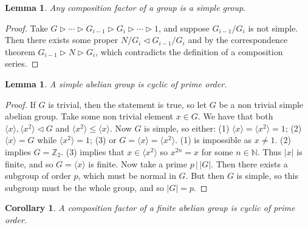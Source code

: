 \documentclass[a4paper,10pt]{article}
\newcommand{\NN}{\mathbb{N}}
\newcommand{\ZZ}{\mathbb{Z}}
\newtheorem{Cor}[thm]{Corollary}
\newtheorem{Lem}[thm]{Lemma}
\begin{document}
\begin{Lem}
Any composition factor of a group is a simple group. 
\end{Lem}
\begin{proof}
Take $G \triangleright \cdots \triangleright G_{i-1} \triangleright G_i \triangleright \cdots \triangleright 1$, and suppose $G_{i-1} / G_i$ is not simple. Then there exists some proper $N / G_{i} \triangleleft G_{i-1} / G_i$ and by the correspondence theorem $G_{i-1} \triangleright N \triangleright G_i$, which contradicts the definition of a composition series.
\end{proof}

\begin{Lem}
A simple abelian group is cyclic of prime order.
\end{Lem}



\begin{proof}
If $G$ is trivial, then the statement is true, so let $G$ be a non trivial simple abelian group. Take some non trivial element $x \in G$. We have that both $\langle x \rangle, \langle x^2 \rangle \triangleleft G$ and $\langle x^2 \rangle \leq \langle x \rangle$. Now $G$ is simple, so either: (1) $\langle x \rangle = \langle x^2 \rangle = 1$; (2) $\langle x \rangle = G$ while $\langle x^2 \rangle = 1$; (3) or $G = \langle x \rangle = \langle x^2 \rangle$. (1) is impossible as $x \neq 1$. (2) implies $G = \ZZ_2$. (3) implies that $x \in \langle x^2 \rangle$ so $x^{2n} = x$ for some $n \in \NN$. Thus $|x|$ is finite, and so $G = \langle x \rangle$ is finite. Now take a prime $p \, \big| \, |G|$.  Then there exists a subgroup of order $p$, which must be normal in $G$. But then $G$ is simple, so this subgroup must be the whole group, and so $|G| = p$.
\end{proof}

\begin{Cor}A composition factor of a finite abelian group is cyclic of prime order. \end{Cor}
\end{document}
